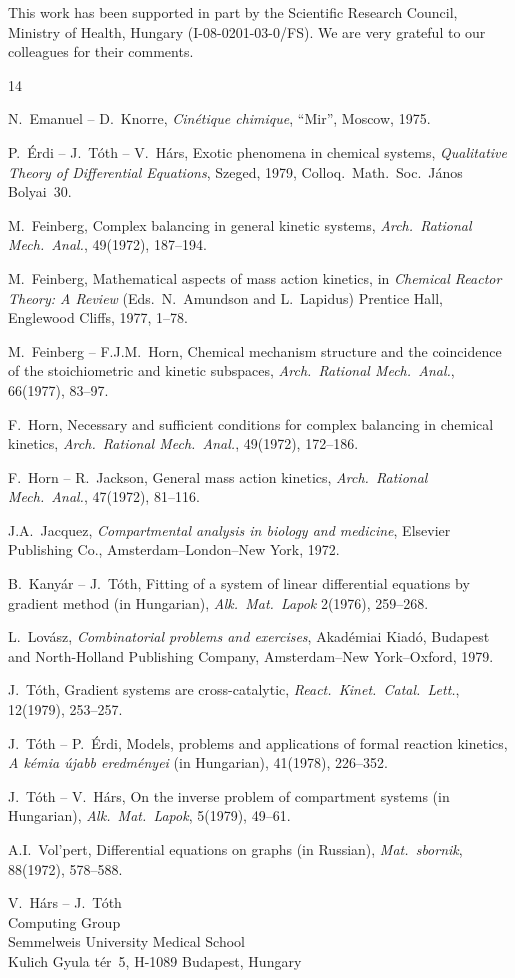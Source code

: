 \documentclass[12pt,a4paper]{article}
\begin{document}
This work has been supported in part by the Scientific Research Council, Ministry of Health, Hungary (I-08-0201-03-0/FS).  We are very grateful to our colleagues for their comments.


\begin{thebibliography}{14}

N.~Emanuel -- D.~Knorre, \emph{Cin\'etique chimique}, ``Mir'', Moscow, 1975.

P.~\'Erdi -- J.~T\'oth -- V.~H\'ars, Exotic phenomena in chemical systems, \emph{Qualitative Theory of Differential Equations}, Szeged, 1979, Colloq.\ Math.\ Soc.\ J\'anos Bolyai~30.

M.~Feinberg, Complex balancing in general kinetic systems, \emph{Arch.\ Rational Mech.\ Anal.}, 49(1972), 187--194.

M.~Feinberg, Mathematical aspects of mass action kinetics, in \emph{Chemical Reactor Theory: A Review} (Eds.\ N.~Amundson and L.~Lapidus) Prentice Hall, Englewood Cliffs, 1977, 1--78.

M.~Feinberg -- F.J.M.~Horn, Chemical mechanism structure and the coincidence of the stoichiometric and kinetic subspaces, \emph{Arch.\ Rational Mech.\ Anal.}, 66(1977), 83--97.

F.~Horn, Necessary and sufficient conditions for complex balancing in chemical kinetics, \emph{Arch.\ Rational Mech.\ Anal.}, 49(1972), 172--186.

F.~Horn -- R.~Jackson, General mass action kinetics, \emph{Arch.\ Rational Mech.\ Anal.}, 47(1972), 81--116.

J.A.~Jacquez, \emph{Compartmental analysis in biology and medicine}, Elsevier Publishing Co., Amsterdam--London--New York, 1972.

B.~Kany\'ar -- J.~T\'oth, Fitting of a system of linear differential equations by gradient method (in Hungarian), \emph{Alk.\ Mat.\ Lapok} 2(1976), 259--268.

L.~Lov\'asz, \emph{Combinatorial problems and exercises}, Akad\'emiai Kiad\'o, Budapest and North-Holland Publishing Company, Amsterdam--New York--Oxford, 1979.

J.~T\'oth, Gradient systems are cross-catalytic, \emph{React.\ Kinet.\ Catal.\ Lett.}, 12(1979), 253--257.

J.~T\'oth -- P.~\'Erdi, Models, problems and applications of formal reaction kinetics, \emph{A k\'emia \'ujabb eredm\'enyei} (in Hungarian), 41(1978), 226--352.

J.~T\'oth -- V.~H\'ars, On the inverse problem of compartment systems (in Hungarian), \emph{Alk.\ Mat.\ Lapok}, 5(1979), 49--61.

A.I.~Vol'pert, Differential equations on graphs (in Russian), \emph{Mat.\ sbornik}, 88(1972), 578--588.

\end{thebibliography}

\bigskip
\noindent
V.~H\'ars -- J.~T\'oth\\
Computing Group\\
Semmelweis University Medical School\\
Kulich Gyula t\'er~5, H-1089 Budapest, Hungary
\end{document}

